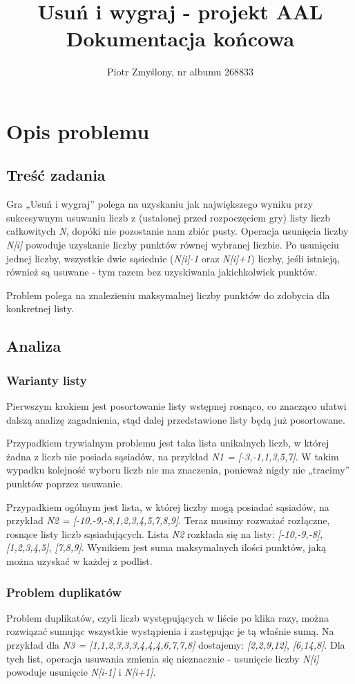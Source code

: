 \documentclass[11pt]{article} %
\title{Usuń i wygraj - projekt AAL\\
\large Dokumentacja końcowa}
\author{Piotr Zmyślony, nr albumu 268833}
\date{} %
\begin{document}
\maketitle

\section{Opis problemu}
\subsection{Treść zadania}
Gra „Usuń i wygraj” polega na uzyskaniu jak największego wyniku przy sukcesywnym usuwaniu liczb z (ustalonej przed rozpoczęciem gry) listy liczb całkowitych \textsl{N}, dopóki nie pozostanie nam zbiór pusty. Operacja usunięcia liczby \textsl{N[i]} powoduje uzyskanie liczby punktów równej wybranej liczbie. Po usunięciu jednej liczby, wszystkie dwie sąsiednie (\textsl{N[i]-1} oraz \textsl{N[i]+1}) liczby, jeśli istnieją, również są usuwane - tym razem bez uzyskiwania jakichkolwiek punktów.

Problem polega na znalezieniu maksymalnej liczby punktów do zdobycia dla konkretnej listy.
\subsection{Analiza}
\subsubsection{Warianty listy}
Pierwszym krokiem jest posortowanie listy wstępnej rosnąco, co znacząco ułatwi dalszą analizę zagadnienia, stąd dalej przedstawione listy będą już posortowane.

Przypadkiem trywialnym problemu jest taka lista unikalnych liczb, w której  żadna z liczb nie posiada sąsiadów, na przykład \textsl{N1 = [-3,-1,1,3,5,7]}. W takim wypadku kolejność wyboru liczb nie ma znaczenia, ponieważ nigdy nie „tracimy” punktów poprzez usuwanie.

Przypadkiem ogólnym jest lista, w której liczby mogą posiadać sąsiadów,  na  przykład \textsl{N2 = [-10,-9,-8,1,2,3,4,5,7,8,9]}. Teraz musimy rozważać rozłączne, rosnące listy liczb sąsiadujących. Lista \textsl{N2} rozkłada się na listy: \textsl{[-10,-9,-8]}, \textsl{[1,2,3,4,5]}, \textsl{[7,8,9]}. Wynikiem jest suma maksymalnych ilości punktów, jaką można uzyskać w każdej z podlist.
\subsubsection{Problem duplikatów}
Problem duplikatów, czyli liczb występujących w liście po klika razy, można rozwiązać sumując wszystkie wystąpienia i zastępując je tą właśnie sumą. Na przykład dla \textsl{N3 = [1,1,2,3,3,3,4,4,4,6,7,7,8]} dostajemy: \textsl{[2,2,9,12]}, \textsl{[6,14,8]}.
Dla tych list, operacja usuwania zmienia się nieznacznie - usunięcie liczby \textsl{N[i]} powoduje usunięcie \textsl{N[i-1]} i \textsl{N[i+1]}.
\end{document}
